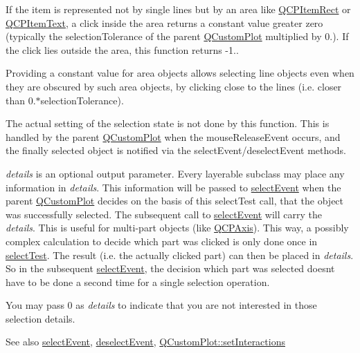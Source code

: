 If the item is represented not by single lines but by an area like \hyperlink{class_q_c_p_item_rect}{Q\+C\+P\+Item\+Rect} or \hyperlink{class_q_c_p_item_text}{Q\+C\+P\+Item\+Text}, a click inside the area returns a constant value greater zero (typically the selection\+Tolerance of the parent \hyperlink{class_q_custom_plot}{Q\+Custom\+Plot} multiplied by 0.). If the click lies outside the area, this function returns -\/1..

Providing a constant value for area objects allows selecting line objects even when they are obscured by such area objects, by clicking close to the lines (i.\+e. closer than 0.$\ast$selection\+Tolerance).

The actual setting of the selection state is not done by this function. This is handled by the parent \hyperlink{class_q_custom_plot}{Q\+Custom\+Plot} when the mouse\+Release\+Event occurs, and the finally selected object is notified via the select\+Event/deselect\+Event methods.

{\itshape details} is an optional output parameter. Every layerable subclass may place any information in {\itshape details}. This information will be passed to \hyperlink{class_q_c_p_abstract_item_aaf92af7b9893712959a6c073d334d88d}{select\+Event} when the parent \hyperlink{class_q_custom_plot}{Q\+Custom\+Plot} decides on the basis of this select\+Test call, that the object was successfully selected. The subsequent call to \hyperlink{class_q_c_p_abstract_item_aaf92af7b9893712959a6c073d334d88d}{select\+Event} will carry the {\itshape details}. This is useful for multi-\/part objects (like \hyperlink{class_q_c_p_axis}{Q\+C\+P\+Axis}). This way, a possibly complex calculation to decide which part was clicked is only done once in \hyperlink{class_q_c_p_abstract_item_a96d522d10ffc0413b9a366c6f7f0476b}{select\+Test}. The result (i.\+e. the actually clicked part) can then be placed in {\itshape details}. So in the subsequent \hyperlink{class_q_c_p_abstract_item_aaf92af7b9893712959a6c073d334d88d}{select\+Event}, the decision which part was selected doesn\textquotesingle{}t have to be done a second time for a single selection operation.

You may pass 0 as {\itshape details} to indicate that you are not interested in those selection details.

\begin{DoxySeeAlso}{See also}
\hyperlink{class_q_c_p_abstract_item_aaf92af7b9893712959a6c073d334d88d}{select\+Event}, \hyperlink{class_q_c_p_abstract_item_a91f090d6763cfedb0749219c63788ae9}{deselect\+Event}, \hyperlink{class_q_custom_plot_a5ee1e2f6ae27419deca53e75907c27e5}{Q\+Custom\+Plot\+::set\+Interactions} 
\end{DoxySeeAlso}



